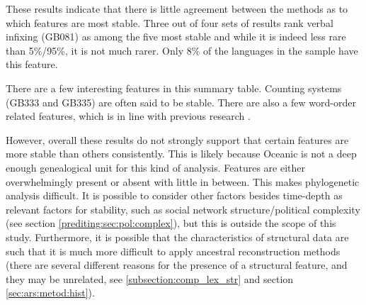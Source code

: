 \documentclass[draft,10pt]{article} %
\begin{document}
These results indicate that there is little agreement between the methods as to which features are most stable. Three out of four sets of results rank verbal infixing (GB081) as among the five most stable and while it is indeed less rare than 5\%/95\%, it is not much rarer. Only 8\% of the languages in the sample have this feature.

There are a few interesting features in this summary table. Counting systems (GB333 and GB335) are often said to be stable. There are also a few word-order related features, which is in line with previous research \citep[c.f.][]{dediu2013some}.

However, overall these results do not strongly support that certain features are more stable than others consistently. This is likely because Oceanic is not a deep enough genealogical unit for this kind of analysis. Features are either overwhelmingly present or absent with little in between. This makes phylogenetic analysis difficult. It is possible to consider other factors besides time-depth as relevant factors for stability, such as social network structure/political complexity (see section \ref{prediting:sec:pol:complex}), but this is outside the scope of this study. Furthermore, it is possible that the characteristics of structural data are such that it is much more difficult to apply ancestral reconstruction methods
(there are several different reasons for the presence of a structural feature, and they may be unrelated, see \ref{subsection:comp_lex_str} and section \ref{sec:ars:metod:hist}).





\end{document}

